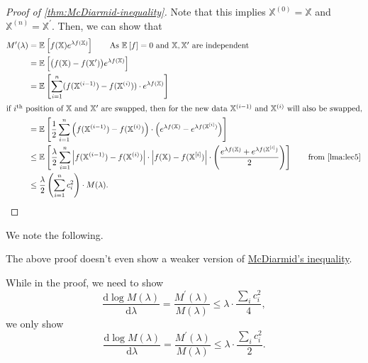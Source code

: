 \begin{proof}[Proof of \autoref{thm:McDiarmid-inequality}]
  Note that this implies \(\mathbb{X}^{(0)} = \mathbb{X}\) and \(\mathbb{X}^{(n)} = \mathbb{X}^{\prime} \). Then, we can show that
  \begin{align*}
    M^{\prime} (\lambda )
     & = \mathbb{E}_{}\left[f(\mathbb{X}) e^{\lambda f(\mathbb{X})} \right] \tag*{As \(\mathbb{E}_{}\left[f \right] = 0\) and \(\mathbb{X}, \mathbb{X}^{\prime} \) are independent}                                                                                                                                                     \\
     & = \mathbb{E}_{}\left[\big(f(\mathbb{X}) - f(\mathbb{X}^{\prime} )\big) e^{\lambda f(\mathbb{X})}\right]                                                                                                                                                                                                                          \\
     & = \mathbb{E}_{}\left[ \sum_{i=1}^{n} (f(\mathbb{X}^{(i-1)}) - f(\mathbb{X}^{(i)})) \cdot e^{\lambda f(\mathbb{X})}\right]                                                                                                                                                                                                        \\
    \intertext{if \(i^{\text{th} }\) position of \(\mathbb{X}\) and \(\mathbb{X}^{\prime} \) are swapped, then for the new data \(\mathbb{X}^{(i-1)}\) and \(\mathbb{X}^{(i)}\) will also be swapped,}
     & = \mathbb{E}_{}\left[\frac{1}{2} \sum_{i=1}^{n} \left( f(\mathbb{X}^{(i-1)}) - f(\mathbb{X}^{(i)}) \right) \cdot \left( e^{\lambda f(\mathbb{X})} - e^{\lambda f(\mathbb{X}^{[i]})} \right)  \right]                                                                                                                             \\
     & \leq \mathbb{E}_{}\left[\frac{\lambda }{2} \sum_{i=1}^{n} \left\vert f(\mathbb{X}^{(i-1)}) - f(\mathbb{X}^{(i)}) \right\vert \cdot \left\vert f(\mathbb{X}) - f(\mathbb{X}^{[i]}) \right\vert \cdot \left( \frac{e^{\lambda f(\mathbb{X})} + e^{\lambda f(\mathbb{X}^{[i]})}}{2} \right)  \right] \tag*{from \autoref{lma:lec5}} \\
     & \leq \frac{\lambda}{2}\left( \sum_{i=1}^{n} c_i^2 \right) \cdot M(\lambda ).
  \end{align*}
\end{proof}

We note the following.

\begin{note}
  The above proof doesn't even show a weaker version of \hyperref[thm:McDiarmid-inequality]{McDiarmid's inequality}.
\end{note}
\begin{explanation}
  While in the proof, we need to show
  \[
    \frac{\mathrm{d}\log M(\lambda )}{\mathrm{d}\lambda } = \frac{M^{\prime} (\lambda )}{M(\lambda )} \leq \lambda \cdot \frac{\sum_{i} c_i^2}{4},
  \]
  we only show
  \[
    \frac{\mathrm{d}\log M(\lambda )}{\mathrm{d}\lambda } = \frac{M^{\prime} (\lambda )}{M(\lambda )} \leq \lambda \cdot \frac{\sum_{i} c_i^2}{2}.
  \]
\end{explanation}

